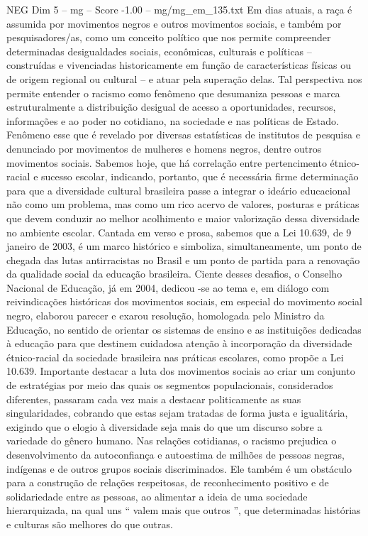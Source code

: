 \begin{textsample}{NEG Dim 5 – mg – Score -1.00 – mg/mg\_em\_135.txt}
Em dias atuais, a raça é assumida por movimentos negros e outros movimentos sociais, e também por pesquisadores/as, como um conceito político que nos permite compreender determinadas desigualdades sociais, econômicas, culturais e políticas – construídas e vivenciadas historicamente em função de características físicas ou de origem regional ou cultural – e atuar pela superação delas.
Tal perspectiva nos permite entender o racismo como fenômeno que desumaniza pessoas e marca estruturalmente a distribuição desigual de acesso a oportunidades, recursos, informações e ao poder no cotidiano, na sociedade e nas políticas de Estado.
Fenômeno esse que é revelado por diversas estatísticas de institutos de pesquisa e denunciado por movimentos de mulheres e homens negros, dentre outros movimentos sociais.
Sabemos hoje, que há correlação entre pertencimento étnico-racial e sucesso escolar, indicando, portanto, que é necessária firme determinação para que a diversidade cultural brasileira passe a integrar o ideário educacional não como um problema, mas como um rico acervo de valores, posturas e práticas que devem conduzir ao melhor acolhimento e maior valorização dessa diversidade no ambiente escolar.
Cantada em verso e prosa, sabemos que a Lei 10.639, de 9 janeiro de 2003, é um marco histórico e simboliza, simultaneamente, um ponto de chegada das lutas antirracistas no Brasil e um ponto de partida para a renovação da qualidade social da educação brasileira.
Ciente desses desafios, o Conselho Nacional de Educação, já em 2004, dedicou -se ao tema e, em diálogo com reivindicações históricas dos movimentos sociais, em especial do movimento social negro, elaborou parecer e exarou resolução, homologada pelo Ministro da Educação, no sentido de orientar os sistemas de ensino e as instituições dedicadas à educação para que destinem cuidadosa atenção à incorporação da diversidade étnico-racial da sociedade brasileira nas práticas escolares, como propõe a Lei 10.639.
Importante destacar a luta dos movimentos sociais ao criar um conjunto de estratégias por meio das quais os segmentos populacionais, considerados diferentes, passaram cada vez mais a destacar politicamente as suas singularidades, cobrando que estas sejam tratadas de forma justa e igualitária, exigindo que o elogio à diversidade seja mais do que um discurso sobre a variedade do gênero humano.
Nas relações cotidianas, o racismo prejudica o desenvolvimento da autoconfiança e autoestima de milhões de pessoas negras, indígenas e de outros grupos sociais discriminados.
Ele também é um obstáculo para a construção de relações respeitosas, de reconhecimento positivo e de solidariedade entre as pessoas, ao alimentar a ideia de uma sociedade hierarquizada, na qual uns “ valem mais que outros ”, que determinadas histórias e culturas são melhores do que outras.

\end{textsample}
